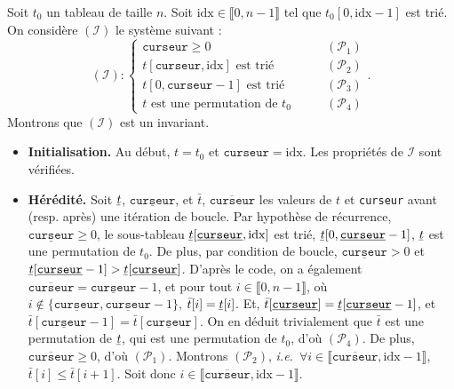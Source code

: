 \documentclass[a4paper]{article}
\begin{document}
	\begin{prv}
		Soit $t_0$ un tableau de taille $n$.
		Soit $\mathrm{idx} \in \llbracket 0,n-1 \rrbracket$ tel que $t_0[0,\mathrm{idx}-1]$ est trié.
		On considère $(\mathcal{I})$ le système suivant : \[
			(\mathcal{I}): \begin{cases}
				\texttt{curseur} \ge 0 \quad\quad & (\mathcal{P}_1)\\
				t[\texttt{curseur}, \mathrm{idx}] \text{ est trié}\quad\quad & (\mathcal{P}_2)\\
				t[0, \texttt{curseur} - 1] \text{ est trié}\quad\quad & (\mathcal{P}_3)\\
				t \text{ est une permutation de } t_0\quad\quad & (\mathcal{P}_4)
			\end{cases}
		.\]
		Montrons que $(\mathcal{I})$ est un invariant.
		\begin{itemize}
			\item \textbf{Initialisation.} Au début, $t = t_0$ et $\texttt{curseur} = \mathrm{idx}$. Les propriétés de $\mathcal{I}$ sont vérifiées.
			\item \textbf{Hérédité.} Soit $\ubar{t}$, $\underline{\texttt{curseur}}$, et $\bar{t}$, $\overline{\texttt{curseur}}$\/ les valeurs de $t$ et \texttt{curseur} avant (resp. après) une itération de boucle.
				Par hypothèse de récurrence, $\underline{\texttt{curseur}} \ge 0$, le sous-tableau $\ubar{t}[\underline{\texttt{curseur}}, \mathrm{idx}]$ est trié, $\ubar{t}[0,\underline{\texttt{curseur}} - 1]$, $\ubar{t}$ est une permutation de $t_0$.
				De plus, par condition de boucle, $\underline{\texttt{curseur}} > 0$ et $\ubar{t}[\underline{\texttt{curseur}} - 1] > \ubar{t}[\underline{\texttt{curseur}}]$.
				D'après le code, on a également $\overline{\texttt{curseur}} = \underline{\texttt{curseur}} - 1$, et pour tout $i \in \llbracket 0,n-1 \rrbracket$, où $i \not\in \{\underline{\texttt{curseur}}, \underline{\texttt{curseur}} - 1\}$, $\bar{t}[i] = \ubar{t}[i]$.
				Et, $\bar{t} [\underline{\texttt{curseur}}] = \ubar{t}[\underline{\texttt{curseur}} - 1]$, et $\bar{t}[\underline{\texttt{curseur}} - 1] = \bar{t}[\underline{\texttt{curseur}}]$.
				On en déduit trivialement que $\bar{t}$ est une permutation de $\ubar{t}$, qui est une permutation de $t_0$, d'où $(\mathcal{P}_4)$.
				De plus, $\overline{\texttt{curseur}} \ge 0$, d'où $(\mathcal{P}_1)$.
				Montrons $(\mathcal{P}_2)$, \textit{i.e.}\ $\forall i \in \llbracket \overline{\texttt{curseur}}, \mathrm{idx} - 1 \rrbracket$, $\bar{t}[i] \le \bar{t}[i+1]$.
				Soit donc $i \in \llbracket \overline{\texttt{curseur}}, \mathrm{idx} - 1 \rrbracket$.

\end{itemize}
\end{prv}
\end{document}
